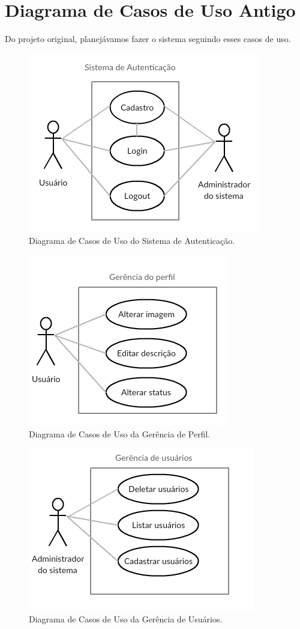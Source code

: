 \documentclass[11pt,a4paper,titlepage]{article}
\begin{document}
\section{Diagrama de Casos de Uso Antigo}
Do projeto original, planejávamos fazer o sistema seguindo esses casos de uso.
\begin{figure}[!ht]
	\centering
	\includegraphics[scale=0.8]{img/casosautenticacao.png}
	\caption{Diagrama de Casos de Uso do Sistema de Autenticação.}
\end{figure}
\begin{figure}[!htb]
	\centering
	\includegraphics[scale=0.8]{img/casosperfil.png}
	\caption{Diagrama de Casos de Uso da Gerência de Perfil.}
\end{figure}
\begin{figure}[!htb]
	\centering
	\includegraphics[scale=0.8]{img/casosusuarios.png}
	\caption{Diagrama de Casos de Uso da Gerência de Usuários.}
\end{figure}
\end{document}
